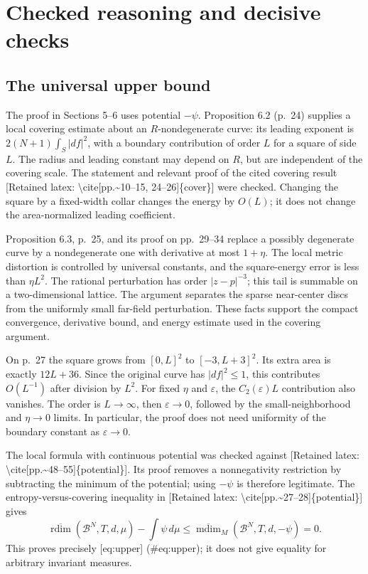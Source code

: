 \documentclass[10pt]{article}
\begin{document}
\section*{Checked reasoning and decisive checks}
\subsection*{The universal upper bound}
The proof in Sections 5–6 uses potential \(-\psi\). Proposition 6.2 (p. 24) supplies a local covering estimate about an \(R\)-nondegenerate curve: its leading exponent is \(2(N+1)\int_S|df|^2\), with a boundary contribution of order \(L\) for a square of side \(L\). The radius and leading constant may depend on \(R\), but are independent of the covering scale. The statement and relevant proof of the cited covering result [Retained latex: \textbackslash{}cite[pp.\textasciitilde{}10--15, 24--26]\{cover\}] were checked. Changing the square by a fixed-width collar changes the energy by \(O(L)\); it does not change the area-normalized leading coefficient.\par
Proposition 6.3, p. 25, and its proof on pp. 29–34 replace a possibly degenerate curve by a nondegenerate one with derivative at most \(1+\eta\). The local metric distortion is controlled by universal constants, and the square-energy error is less than \(\eta L^2\). The rational perturbation has order \(|z-p|^{-3}\); this tail is summable on a two-dimensional lattice. The argument separates the sparse near-center discs from the uniformly small far-field perturbation. These facts support the compact convergence, derivative bound, and energy estimate used in the covering argument.\par
On p. 27 the square grows from \([0,L]^2\) to \([-3,L+3]^2\). Its extra area is exactly \(12L+36\). Since the original curve has \(|df|^2\leq1\), this contributes \(O(L^{-1})\) after division by \(L^2\). For fixed \(\eta\) and \(\varepsilon\), the \(C_2(\varepsilon)L\) contribution also vanishes. The order is \(L\to\infty\), then \(\varepsilon\to0\), followed by the small-neighborhood and \(\eta\to0\) limits. In particular, the proof does not need uniformity of the boundary constant as \(\varepsilon\to0\).\par
The local formula with continuous potential was checked against [Retained latex: \textbackslash{}cite[pp.\textasciitilde{}48--55]\{potential\}]. Its proof removes a nonnegativity restriction by subtracting the minimum of the potential; using \(-\psi\) is therefore legitimate. The entropy-versus-covering inequality in [Retained latex: \textbackslash{}cite[pp.\textasciitilde{}27--28]\{potential\}] gives \[\overline{\operatorname{rdim}}(\mathcal B^N,T,d,\mu)-\int\psi\,d\mu
 \leq\overline{\operatorname{mdim}}_{M}(\mathcal B^N,T,d,-\psi)=0 .\] This proves precisely [eq:upper] (\#eq:upper); it does not give equality for arbitrary invariant measures.\par
\end{document}
